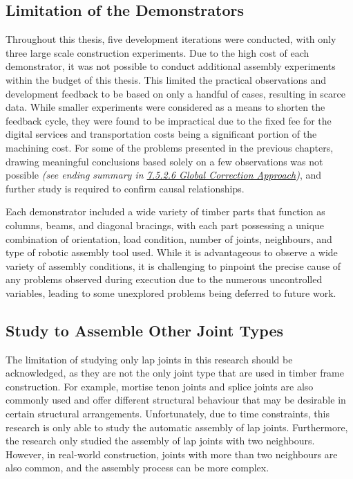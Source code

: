 \subsection{Limitation of the Demonstrators}

Throughout this thesis, five development iterations were conducted, with only three large scale construction experiments. Due to the high cost of each demonstrator, it was not possible to conduct additional assembly experiments within the budget of this thesis. This limited the practical observations and development feedback to be based on only a handful of cases, resulting in scarce data. While smaller experiments were considered as a means to shorten the feedback cycle, they were found to be impractical due to the fixed fee for the digital services and transportation costs being a significant portion of the machining cost. For some of the problems presented in the previous chapters, drawing meaningful conclusions based solely on a few observations was not possible \textit{(see ending summary in \uline{7.5.2.6 Global Correction Approach})}, and further study is required to confirm causal relationships. 

Each demonstrator included a wide variety of timber parts that function as columns, beams, and diagonal bracings, with each part possessing a unique combination of orientation, load condition, number of joints, neighbours, and type of robotic assembly tool used. While it is advantageous to observe a wide variety of assembly conditions, it is challenging to pinpoint the precise cause of any problems observed during execution due to the numerous uncontrolled variables, leading to some unexplored problems being deferred to future work.

\subsection{Study to Assemble Other Joint Types}

The limitation of studying only lap joints in this research should be acknowledged, as they are not the only joint type that are used in timber frame construction. For example, mortise tenon joints and splice joints are also commonly used and offer different structural behaviour that may be desirable in certain structural arrangements. Unfortunately, due to time constraints, this research is only able to study the automatic assembly of lap joints. Furthermore, the research only studied the assembly of lap joints with two neighbours. However, in real-world construction, joints with more than two neighbours are also common, and the assembly process can be more complex. 

